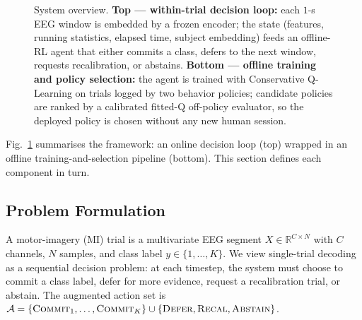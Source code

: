 \begin{figure}[!t]
\caption{System overview. \textbf{Top --- within-trial decision
loop:} each $1$-s EEG window is embedded by a frozen encoder; the
state (features, running statistics, elapsed time, subject
embedding) feeds an offline-RL agent that either commits a class,
defers to the next window, requests recalibration, or abstains.
\textbf{Bottom --- offline training and policy selection:} the
agent is trained with Conservative Q-Learning on trials logged by
two behavior policies; candidate policies are ranked by a
calibrated fitted-Q off-policy evaluator, so the deployed policy
is chosen without any new human session.}
\label{fig:system_overview}
\end{figure}

Fig.~\ref{fig:system_overview} summarises the framework: an
online decision loop (top) wrapped in an offline
training-and-selection pipeline (bottom). This section defines
each component in turn.

\subsection{Problem Formulation}\label{sec:methods:problem}

A motor-imagery (MI) trial is a multivariate EEG segment $X \in
\mathbb{R}^{C \times N}$ with $C$ channels, $N$ samples, and class label
$y \in \{1,\ldots,K\}$. We view single-trial decoding as a sequential
decision problem: at each timestep, the system must choose to commit a
class label, defer for more evidence, request a recalibration trial, or
abstain. The augmented action set is
$\mathcal{A} = \{\textsc{Commit}_1, \ldots, \textsc{Commit}_K\} \cup
\{\textsc{Defer}, \textsc{Recal}, \textsc{Abstain}\}$.

